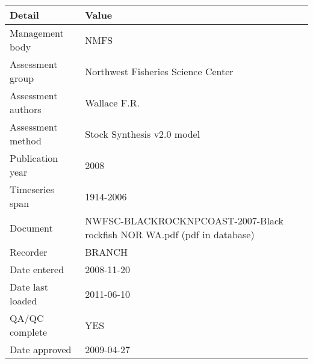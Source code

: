 \begin{table}[htb]
\centering
\begin{tabular}{lp{7cm}}
\toprule
Detail & Value \\
\midrule
Management body    & NMFS                                                                    \\
Assessment group   & Northwest Fisheries Science Center                                      \\
Assessment authors & Wallace F.R.                                                            \\
Assessment method  & Stock Synthesis v2.0 model                                              \\
Publication year   & 2008                                                                    \\
Timeseries span    & 1914-2006                                                               \\
Document           & NWFSC-BLACKROCKNPCOAST-2007-Black rockfish NOR WA.pdf (pdf in database) \\
Recorder           & BRANCH                                                                  \\
Date entered       & 2008-11-20                                                              \\
Date last loaded   & 2011-06-10                                                              \\
QA/QC complete     & YES                                                                     \\
Date approved      & 2009-04-27                                                              \\
\bottomrule
\end{tabular}
\label{tab:assessdet}
\end{table}
